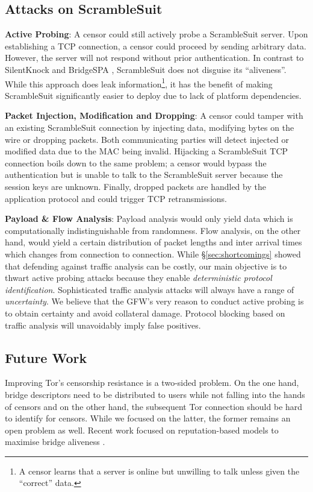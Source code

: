 \documentclass{sig-alternate}
\newcommand{\pt}{\textsf{ScrambleSuit}}
\numberwithin{enumi}{section}
\numberwithin{notesctr}{section}
\begin{document}
\subsection{Attacks on ScrambleSuit}

\textbf{Active Probing}: A censor could still actively probe a \pt{} server. Upon
establishing a TCP connection, a censor could proceed by sending arbitrary data. However, the server
will not respond without prior authentication. In contrast to SilentKnock \cite{Vasserman2007} and
BridgeSPA \cite{Smits2011}, \pt{} does not disguise its ``aliveness''. While this approach does
leak information\footnote{A censor learns that a server is online but unwilling to talk unless given
the ``correct'' data.}, it has the benefit of making \pt{} significantly easier to deploy due to
lack of platform dependencies.

\textbf{Packet Injection, Modification and Dropping}: A censor could tamper with an existing \pt{}
connection by injecting data, modifying bytes on the wire or dropping packets. Both communicating
parties will detect injected or modified data due to the MAC being invalid. Hijacking a \pt{} TCP
connection boils down to the same problem; a censor would bypass the authentication but is unable to
talk to the \pt{} server because the session keys are unknown. Finally, dropped packets are handled
by the application protocol and could trigger TCP retransmissions.

\textbf{Payload \& Flow Analysis}: Payload analysis would only yield data which is computationally
indistinguishable from randomness. Flow analysis, on the other hand, would yield a certain
distribution of packet lengths and inter arrival times which changes from connection to connection.
While \S \ref{sec:shortcomings} showed that defending against traffic analysis can be costly, our
main objective is to thwart active probing attacks because they enable \emph{deterministic protocol
identification}. Sophisticated traffic analysis attacks will always have a range of
\emph{uncertainty}. We believe that the GFW's very reason to conduct active probing is to obtain
certainty and avoid collateral damage. Protocol blocking based on traffic analysis will unavoidably
imply false positives.

\subsection{Future Work}
Improving Tor's censorship resistance is a two-sided problem. On the one hand, bridge descriptors
need to be distributed to users while not falling into the hands of censors and on the other hand,
the subsequent Tor connection should be hard to identify for censors. While we focused on the
latter, the former remains an open problem as well. Recent work focused on reputation-based models to
maximise bridge aliveness \cite{McCoy2011,Wang2013}.
\end{document}
